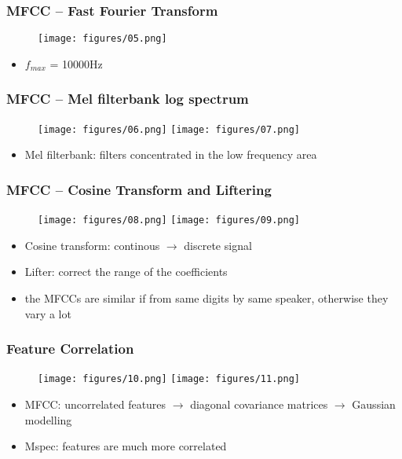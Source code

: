 \documentclass[t]{beamer}
\begin{document}
\begin{frame}
	\frametitle{MFCC -- Fast Fourier Transform}
	\begin{figure}
		\texttt{[image: figures/05.png]}
	\end{figure}
\begin{itemize}
\item $f_{max}$ = 10000Hz
\end{itemize}

\end{frame}
	
\begin{frame}
	\frametitle{MFCC -- Mel filterbank log spectrum}
	\begin{figure}
		\texttt{[image: figures/06.png]}
		\texttt{[image: figures/07.png]}
	\end{figure}

	\begin{itemize}
		\item Mel filterbank: filters concentrated in the low frequency area
	\end{itemize}

\end{frame}
	
\begin{frame}
	\frametitle{MFCC -- Cosine Transform and Liftering}
	\begin{figure}
\centering
		\texttt{[image: figures/08.png]}
		\texttt{[image: figures/09.png]}
	\end{figure}
		  
	\begin{itemize}
		\item Cosine transform: continous $\rightarrow$ discrete signal
		\item Lifter: correct the range of the coefficients
		\item the MFCCs are similar if from same digits by same speaker, otherwise they vary a lot
	\end{itemize}

\end{frame}
	
\begin{frame}
	\frametitle{Feature Correlation}
	\begin{figure}
		\centering
		\texttt{[image: figures/10.png]}
		\texttt{[image: figures/11.png]}
	\end{figure}
		  
	\begin{itemize}
		\item MFCC: uncorrelated features $\rightarrow$ diagonal covariance matrices $\rightarrow$ Gaussian modelling
		\item Mspec: features are much more correlated
	\end{itemize}
\end{frame}
	
\end{document}

